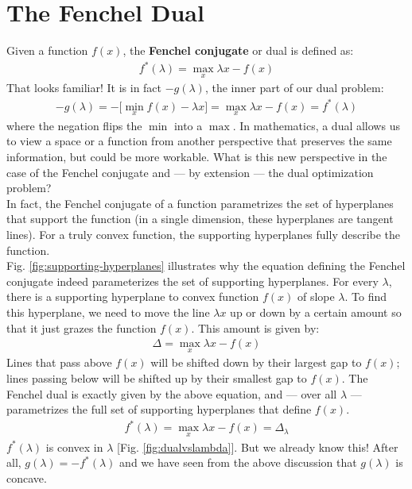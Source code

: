 \documentclass[11pt,a4paper,twoside]{scrartcl} %
\begin{document}
\section{The Fenchel Dual}
Given a function $f(x)$, the \textbf{Fenchel conjugate} or dual is defined as: 
\begin{gather*}
    f^*(\lambda) = \max_x \lambda x - f(x)
\end{gather*}
That looks familiar! It is in fact $-g(\lambda)$, the inner part of our dual problem: 
\begin{gather*}
    - g(\lambda) = -\bigg[\min_x f(x) - \lambda x\bigg] = \max_x \lambda x - f(x) = f^*(\lambda)
\end{gather*}
where the negation flips the $\min$ into a $\max$. In mathematics, a dual allows us to view a space or a function from another perspective that preserves the same information, but could be more workable. What is this new perspective in the case of the Fenchel conjugate and --- by extension --- the dual optimization problem?\\
\newline
In fact, the Fenchel conjugate of a function parametrizes the set of hyperplanes that support the function (in a single dimension, these hyperplanes are tangent lines). For a truly convex function, the supporting hyperplanes fully describe the function. \\
\newline
Fig. \ref{fig:supporting-hyperplanes} illustrates why the equation defining the Fenchel conjugate indeed parameterizes the set of supporting hyperplanes. For every $\lambda$, there is a supporting hyperplane to convex function $f(x)$ of slope $\lambda$. To find this hyperplane, we need to move the line $\lambda x$ up or down by a certain amount so that it just grazes the function $f(x)$. This amount is given by: 
\begin{gather*}
    \Delta = \max_x \lambda x - f(x)
\end{gather*}
Lines that pass above $f(x)$ will be shifted down by their largest gap to $f(x)$; lines passing below will be shifted up by their smallest gap to $f(x)$. The Fenchel dual is exactly given by the above equation, and --- over all $\lambda$ --- parametrizes the full set of supporting hyperplanes that define $f(x)$. 
\begin{gather*}
f^*(\lambda) = \max_x \lambda x - f(x) = \Delta_{\lambda}
\end{gather*}
$f^*(\lambda)$ is convex in $\lambda$ [Fig. \ref{fig:dualvslambda}]. But we already know this! After all, $g(\lambda) = -f^*(\lambda)$ and we have seen from the above discussion that $g(\lambda)$ is concave.
\end{document}
